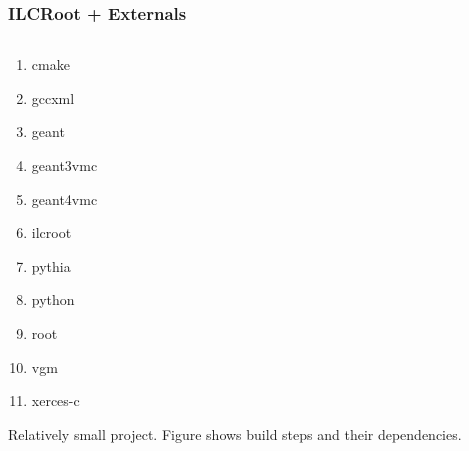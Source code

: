 \documentclass[xcolor=dvipsnames]{beamer}
\begin{document}
\begin{frame}[fragile]
  \frametitle{ILCRoot + Externals}
  \vspace{-7mm}

  \begin{columns}
    \begin{column}{0.5\textwidth}
      \begin{enumerate}
      \item       cmake
      \item     gccxml
      \item    geant
      \item     geant3vmc
      \item geant4vmc
      \item ilcroot
      \item   pythia
      \item    python
      \item    root
      \item      vgm
      \item       xerces-c
      \end{enumerate}
      {\footnotesize Relatively small project.
        Figure shows build steps and their dependencies.}
    \end{column}
    \begin{column}{0.5\textwidth}

\end{column}
\end{columns}
\end{frame}
\end{document}

